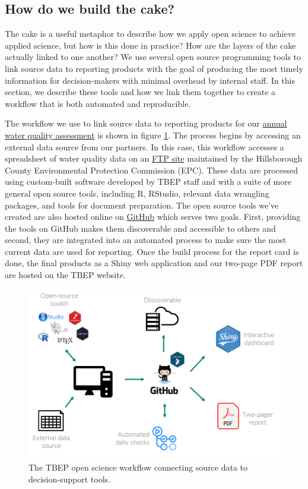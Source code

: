 \documentclass[
]{book}
\begin{document}
\hypertarget{automation}{%
\subsection{How do we build the cake?}\label{automation}}

The cake is a useful metaphor to describe how we apply open science to achieve applied science, but how is this done in practice? How are the layers of the cake actually linked to one another? We use several open source programming tools to link source data to reporting products with the goal of producing the most timely information for decision-makers with minimal overhead by internal staff. In this section, we describe these tools and how we link them together to create a workflow that is both automated and reproducible.

The workflow we use to link source data to reporting products for our \href{https://tbep.org/water-quality-report-card/}{annual water quality assessment} is shown in figure \ref{fig:osworkflow}. The process begins by accessing an external data source from our partners. In this case, this workflow accesses a spreadsheet of water quality data on an \href{ftp://ftp.epchc.org/EPC_ERM_FTP/WQM_Reports/}{FTP site} maintained by the Hillsborough County Environmental Protection Commission (EPC). These data are processed using custom-built software developed by TBEP staff and with a suite of more general open source tools, including R, RStudio, relevant data wrangling packages, and tools for document preparation. The open source tools we've created are also hosted online on \href{https://github.com/tbep-tech}{GitHub} which serves two goals. First, providing the tools on GitHub makes them discoverable and accessible to others and second, they are integrated into an automated process to make sure the most current data are used for reporting. Once the build process for the report card is done, the final products as a Shiny web application and our two-page PDF report are hosted on the TBEP website.

\begin{figure}

{\centering \includegraphics[width=1\linewidth]{img/os-workflow} 

}

\caption{The TBEP open science workflow connecting source data to decision-support tools.}\label{fig:osworkflow}
\end{figure}
\end{document}
